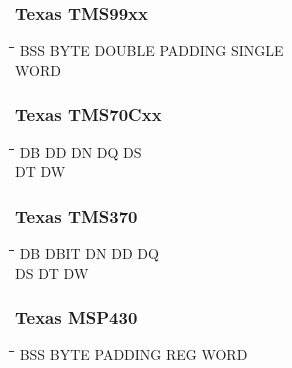 \subsubsection{Texas TMS99xx}
{\tt\begin{tabbing}
\hspace{3cm}\=\hspace{3cm}\=\hspace{3cm}\=\hspace{3cm}\=\kill
BSS        \> BYTE        \> DOUBLE      \> PADDING     \> SINGLE \\
WORD \\
\end{tabbing}}

\subsubsection{Texas TMS70Cxx}
{\tt\begin{tabbing}
\hspace{3cm}\=\hspace{3cm}\=\hspace{3cm}\=\hspace{3cm}\=\kill
DB         \> DD          \> DN          \> DQ          \> DS \\
DT         \> DW \\
\end{tabbing}}

\subsubsection{Texas TMS370}
{\tt\begin{tabbing}
\hspace{3cm}\=\hspace{3cm}\=\hspace{3cm}\=\hspace{3cm}\=\kill
DB         \> DBIT        \> DN          \> DD          \> DQ \\
DS         \> DT          \> DW \\
\end{tabbing}}

\subsubsection{Texas MSP430}
{\tt\begin{tabbing}
\hspace{3cm}\=\hspace{3cm}\=\hspace{3cm}\=\hspace{3cm}\=\kill
BSS        \> BYTE        \> PADDING     \> REG         \> WORD \\
\end{tabbing}}

